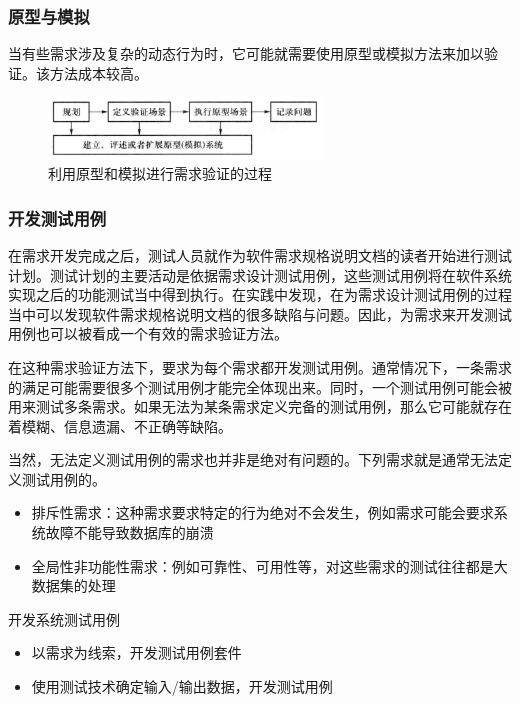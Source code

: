 \subsubsection{原型与模拟}
当有些需求涉及复杂的动态行为时，它可能就需要使用原型或模拟方法来加以验证。该方法成本较高。
\begin{figure}[H]
    \centering
    \vspace{-0.2em}
	\includegraphics[width=0.65\textwidth]{img/利用原型和模拟进行需求验证的过程.png}
    \caption*{利用原型和模拟进行需求验证的过程}
    \vspace{-1em}
\end{figure}


\subsubsection{开发测试用例}
在需求开发完成之后，测试人员就作为软件需求规格说明文档的读者开始进行测试计划。测试计划的主要活动是依据需求设计测试用例，这些测试用例将在软件系统实现之后的功能测试当中得到执行。在实践中发现，在为需求设计测试用例的过程当中可以发现软件需求规格说明文档的很多缺陷与问题。因此，为需求来开发测试用例也可以被看成一个有效的需求验证方法。

在这种需求验证方法下，要求为每个需求都开发测试用例。通常情况下，一条需求的满足可能需要很多个测试用例才能完全体现出来。同时，一个测试用例可能会被用来测试多条需求。如果无法为某条需求定义完备的测试用例，那么它可能就存在着模糊、信息遗漏、不正确等缺陷。

当然，无法定义测试用例的需求也并非是绝对有问题的。下列需求就是通常无法定义测试用例的。
\begin{itemize}
    \item 排斥性需求：这种需求要求特定的行为绝对不会发生，例如需求可能会要求系统故障不能导致数据库的崩溃
    \item 全局性非功能性需求：例如可靠性、可用性等，对这些需求的测试往往都是大数据集的处理
\end{itemize}

开发系统测试用例
\begin{itemize}
    \item 以需求为线索，开发测试用例套件
    \item 使用测试技术确定输入/输出数据，开发测试用例
\end{itemize}

